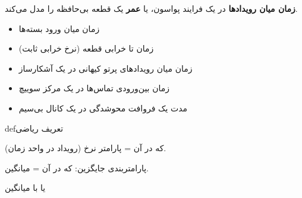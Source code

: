 \begin{Shaded}
\begin{Highlighting}[]
\NormalTok{(}\OperatorTok{,}\NormalTok{ (}\OperatorTok{+}\NormalTok{)}\OperatorTok{/}\OperatorTok{,} \NormalTok{(}\NormalTok{))}\OperatorTok{;}
\NormalTok{(}\OperatorTok{,}\NormalTok{ (}\OperatorTok{{-}}\NormalTok{)}\OperatorTok{\^{}}\OperatorTok{/}\OperatorTok{,} \NormalTok{(}\NormalTok{))}\OperatorTok{;}
\end{Highlighting}
\end{Shaded}



\textbf{زمان میان رویدادها} در یک فرایند پواسون، یا \textbf{عمر} یک قطعه بی‌حافظه را مدل می‌کند.


\begin{itemize}
\tightlist
\item
  زمان میان ورود بسته‌ها
\item
  زمان تا خرابی قطعه (نرخ خرابی ثابت)
\item
  زمان میان رویدادهای پرتو کیهانی در یک آشکارساز
\item
  زمان بین‌ورودی تماس‌ها در یک مرکز سوییچ
\item
  مدت یک فروافت محوشدگی در یک کانال بی‌سیم
\end{itemize}

\begin{PSbox}[unbreakable]{def}{تعریف ریاضی}

 که در آن \lr{$\lambda$} = پارامتر نرخ (رویداد در واحد زمان).

پارامتربندی جایگزین:  که در آن  = میانگین.

\end{PSbox}



یا با میانگین 

